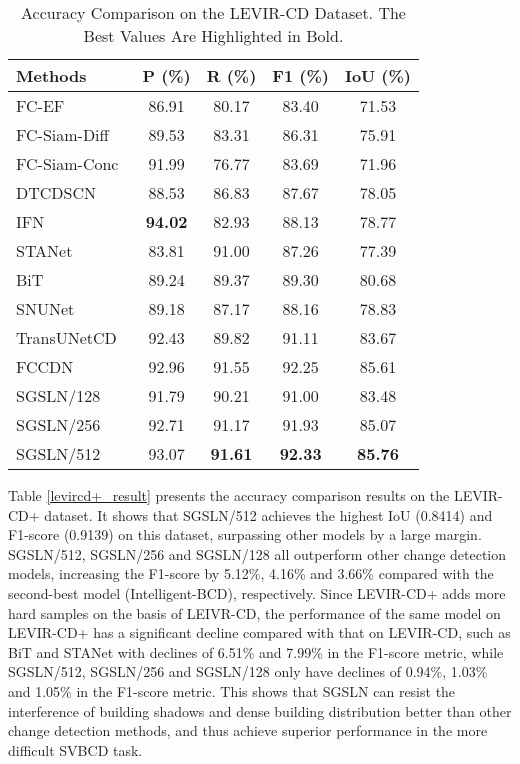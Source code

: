 \documentclass[journal]{IEEEtran}
\begin{document}
\begin{table}[!ht]
\caption{Accuracy Comparison on the LEVIR-CD Dataset. The Best Values Are Highlighted in Bold.}
\label{levircd_result}
\centering
\begin{tabular}{lcccc}
\toprule
Methods & P (\%) & R (\%) & F1 (\%) & IoU (\%) \\
\midrule
FC-EF~\cite{fcef} & 86.91 & 80.17 & 83.40 & 71.53 \\
FC-Siam-Diff~\cite{fcef} & 89.53 & 83.31 & 86.31 & 75.91 \\
FC-Siam-Conc~\cite{fcef} & 91.99 & 76.77 & 83.69 & 71.96\\ 
DTCDSCN~\cite{dtcdstn} & 88.53 & 86.83 & 87.67 & 78.05\\ 
IFN~\cite{dsifn} & \textbf{94.02} & 82.93 & 88.13 & 78.77 \\
STANet~\cite{sta} & 83.81 & 91.00 & 87.26 & 77.39 \\
BiT~\cite{bit} & 89.24 & 89.37 & 89.30 & 80.68 \\
SNUNet~\cite{snu} & 89.18 & 87.17 & 88.16 & 78.83 \\
TransUNetCD~\cite{transunetcd} & 92.43 & 89.82 & 91.11 & 83.67\\
FCCDN~\cite{fccdn} & 92.96 & 91.55 & 92.25 & 85.61 \\
SGSLN/128 & 91.79 & 90.21 & 91.00 & 83.48 \\
SGSLN/256 & 92.71 & 91.17 & 91.93 & 85.07 \\
SGSLN/512 & 93.07 & \textbf{91.61} & \textbf{92.33} & \textbf{85.76} \\
\bottomrule
\end{tabular}
\end{table}

Table \ref{levircd+_result} presents the accuracy comparison results on the LEVIR-CD+ dataset. It shows that SGSLN/512 achieves the highest IoU (0.8414) and F1-score (0.9139) on this dataset, surpassing other models by a large margin. SGSLN/512, SGSLN/256 and SGSLN/128 all outperform other change detection models, increasing the F1-score by 5.12\%, 4.16\% and 3.66\% compared with the second-best model (Intelligent-BCD), respectively. Since LEVIR-CD+ adds more hard samples on the basis of LEIVR-CD, the performance of the same model on LEVIR-CD+ has a significant decline compared with that on LEVIR-CD, such as BiT and STANet with declines of 6.51\% and 7.99\% in the F1-score metric, while SGSLN/512, SGSLN/256 and SGSLN/128 only have declines of 0.94\%, 1.03\% and 1.05\% in the F1-score metric. This shows that SGSLN can resist the interference of building shadows and dense building distribution better than other change detection methods, and thus achieve superior performance in the more difficult SVBCD task.
\end{document}
